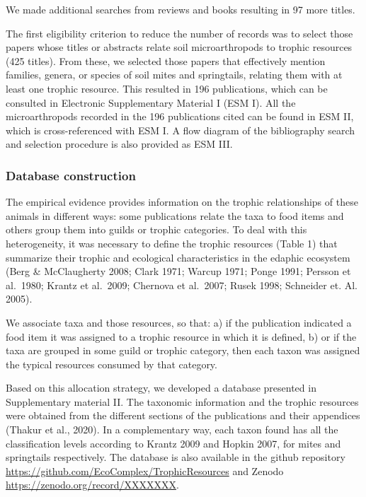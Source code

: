 \documentclass[11pt]{article}
\begin{document}
We made additional searches from reviews and books resulting in 97 more
titles.

The first eligibility criterion to reduce the number of records was to
select those papers whose titles or abstracts relate soil
microarthropods to trophic resources (425 titles). From these, we
selected those papers that effectively mention families, genera, or
species of soil mites and springtails, relating them with at least one
trophic resource. This resulted in 196 publications, which can be
consulted in Electronic Supplementary Material I (ESM I). All the
microarthropods recorded in the 196 publications cited can be found in
ESM II, which is cross-referenced with ESM I. A flow diagram of the
bibliography search and selection procedure is also provided as ESM III.

\hypertarget{database-construction}{%
\subsubsection{Database construction}\label{database-construction}}

The empirical evidence provides information on the trophic relationships
of these animals in different ways: some publications relate the taxa to
food items and others group them into guilds or trophic categories. To
deal with this heterogeneity, it was necessary to define the trophic
resources (Table 1) that summarize their trophic and ecological
characteristics in the edaphic ecosystem (Berg \& McClaugherty 2008;
Clark 1971; Warcup 1971; Ponge 1991; Persson et al.~1980; Krantz et
al.~2009; Chernova et al.~2007; Rusek 1998; Schneider et. Al. 2005).

We associate taxa and those resources, so that: a) if the publication
indicated a food item it was assigned to a trophic resource in which it
is defined, b) or if the taxa are grouped in some guild or trophic
category, then each taxon was assigned the typical resources consumed by
that category.

Based on this allocation strategy, we developed a database presented in
Supplementary material II. The taxonomic information and the trophic
resources were obtained from the different sections of the publications
and their appendices (Thakur et al., 2020). In a complementary way, each
taxon found has all the classification levels according to Krantz 2009
and Hopkin 2007, for mites and springtails respectively. The database is
also available in the github repository
\url{https://github.com/EcoComplex/TrophicResources} and Zenodo
\url{https://zenodo.org/record/XXXXXXX}.
\end{document}

